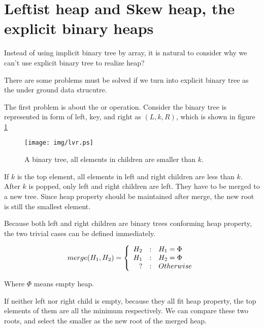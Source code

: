 \documentclass{article}
\begin{document}
\section{Leftist heap and Skew heap, the explicit binary heaps}
\label{ebheap}

Instead of using implicit binary tree by array, it is natural to
consider why we can't use explicit binary tree to realize heap?

There are some problems must be solved if we turn into explicit
binary tree as the under ground data strucutre.

The first problem is about the  or  operation.
Consider the binary tree is represented in form of left, key, and right as
$(L, k, R)$, which is shown in figure \ref{fig:lvr}

\begin{figure}[htbp]
       \begin{center}
       	  \texttt{[image: img/lvr.ps]}
        \caption{A binary tree, all elements in children are smaller than $k$.} \label{fig:lvr}
       \end{center}
\end{figure}

If $k$ is the top element, all elements in left and right children are less
than $k$. After $k$ is popped, only left and right children are left.
They have to be merged to a new tree. Since heap property should be maintained
after merge, the new root is still the smallest element.

Because both left and right children are binary trees conforming heap property,
the two trivial cases can be defined immediately.

\[
merge(H_1, H_2) = \left \{
  \begin{array}
  {r@{\quad:\quad}l}
  H_2 & H_1 = \Phi \\
  H_1 & H_2 = \Phi \\
  ? & Otherwise
  \end{array}
\right.
\]

Where $\Phi$ means empty heap.

If neither left nor right child is empty, because they all fit
heap property, the top elements of them are all the minimum respectively.
We can compare these two roots,
and select the smaller as the new root of the merged heap.
\end{document}
